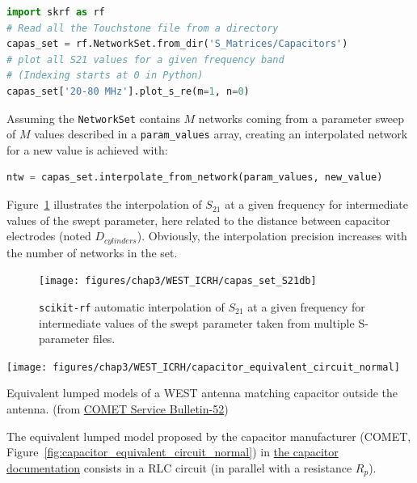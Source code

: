 {\begin{lstlisting}[language=Python]
import skrf as rf
# Read all the Touchstone file from a directory
capas_set = rf.NetworkSet.from_dir('S_Matrices/Capacitors')
# plot all S21 values for a given frequency band
# (Indexing starts at 0 in Python)
capas_set['20-80 MHz'].plot_s_re(m=1, n=0)
\end{lstlisting}

Assuming the \texttt{NetworkSet} contains $M$ networks coming from a parameter sweep of $M$ values described in a \texttt{param\_values} array, creating an interpolated network for a new value is achieved with:

\begin{lstlisting}[language=Python]
ntw = capas_set.interpolate_from_network(param_values, new_value)\end{lstlisting}

Figure~\ref{fig:capassets21db} illustrates the interpolation of $S_{21}$ at a given frequency for intermediate values of the swept parameter, here related to the distance between capacitor electrodes (noted $D_{cylinders}$). Obviously, the interpolation precision increases with the number of networks in the set.

\begin{figure}
	\centering
	\texttt{[image: figures/chap3/WEST\_ICRH/capas\_set\_S21db]}
	\caption{\texttt{scikit-rf} automatic interpolation of $S_{21}$ at a given frequency for intermediate values of the swept parameter taken from multiple S-parameter files. }
	\label{fig:capassets21db}
\end{figure}


\begin{marginfigure}
	\centering
	\texttt{[image: figures/chap3/WEST\_ICRH/capacitor\_equivalent\_circuit\_normal]}
	\caption{Equivalent lumped models of a WEST antenna matching capacitor outside the antenna. (from 	\href{https://www.comet-pct.com/getmedia/fb744f1b-1125-4c91-8af3-e058fa56a3bd/SB-52_Technical_Recommendations_and_General_Instructions_for_Vacuum_Capacitors.aspx}{COMET Service Bulletin-52})}
	\label{fig:capacitor_equivalent_circuit_normal}	  
\end{marginfigure}

The equivalent lumped model proposed by the capacitor manufacturer (COMET, Figure~\ref{fig:capacitor_equivalent_circuit_normal}) in \href{https://www.comet-pct.com/getmedia/fb744f1b-1125-4c91-8af3-e058fa56a3bd/SB-52_Technical_Recommendations_and_General_Instructions_for_Vacuum_Capacitors.aspx}{the capacitor documentation} consists in a RLC circuit (in parallel with a resistance $R_p$). 


}
